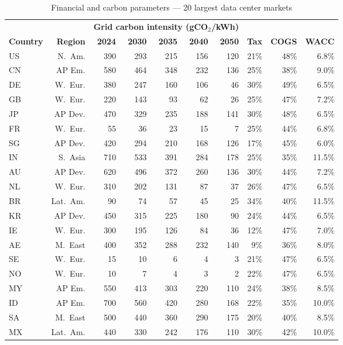 \begin{table}[H]
\centering
\footnotesize
\caption{Financial and carbon parameters --- 20 largest data center markets}
\label{tab:app_country_full}
\begin{tabular}{@{}l r rrrrr rrr@{}}
\toprule
& & \multicolumn{5}{c}{\textbf{Grid carbon intensity (gCO$_2$/kWh)}} & & & \\
\cmidrule(lr){3-7}
\textbf{Country} & \textbf{Region} & \textbf{2024} & \textbf{2030} & \textbf{2035} & \textbf{2040} & \textbf{2050} & \textbf{Tax} & \textbf{COGS} & \textbf{WACC} \\
\midrule
US & N.\ Am. & 390 & 293 & 215 & 156 & 120 & 21\% & 48\% & 6.8\% \\
CN & AP Em. & 580 & 464 & 348 & 232 & 136 & 25\% & 38\% & 9.0\% \\
DE & W.\ Eur. & 380 & 247 & 160 & 106 & 46 & 30\% & 49\% & 6.5\% \\
GB & W.\ Eur. & 220 & 143 & 93 & 62 & 26 & 25\% & 47\% & 7.2\% \\
JP & AP Dev. & 470 & 329 & 235 & 188 & 141 & 30\% & 48\% & 6.5\% \\
FR & W.\ Eur. & 55 & 36 & 23 & 15 & 7 & 25\% & 44\% & 6.8\% \\
SG & AP Dev. & 420 & 294 & 210 & 168 & 126 & 17\% & 45\% & 6.0\% \\
IN & S.\ Asia & 710 & 533 & 391 & 284 & 178 & 25\% & 35\% & 11.5\% \\
AU & AP Dev. & 620 & 496 & 372 & 260 & 136 & 30\% & 44\% & 7.2\% \\
NL & W.\ Eur. & 310 & 202 & 131 & 87 & 37 & 26\% & 47\% & 6.5\% \\
BR & Lat.\ Am. & 90 & 74 & 57 & 45 & 25 & 34\% & 40\% & 11.5\% \\
KR & AP Dev. & 450 & 315 & 225 & 180 & 90 & 24\% & 44\% & 6.5\% \\
IE & W.\ Eur. & 300 & 195 & 126 & 84 & 36 & 12\% & 47\% & 7.0\% \\
AE & M.\ East & 400 & 352 & 288 & 232 & 140 & 9\% & 36\% & 8.0\% \\
SE & W.\ Eur. & 15 & 10 & 6 & 4 & 3 & 21\% & 47\% & 6.5\% \\
NO & W.\ Eur. & 10 & 7 & 4 & 3 & 2 & 22\% & 47\% & 6.5\% \\
MY & AP Em. & 550 & 413 & 303 & 220 & 110 & 24\% & 38\% & 8.5\% \\
ID & AP Em. & 700 & 560 & 420 & 280 & 168 & 22\% & 35\% & 10.0\% \\
SA & M.\ East & 500 & 440 & 360 & 290 & 175 & 20\% & 40\% & 8.5\% \\
MX & Lat.\ Am. & 440 & 330 & 242 & 176 & 110 & 30\% & 42\% & 10.0\% \\
\bottomrule
\end{tabular}
\end{table}

